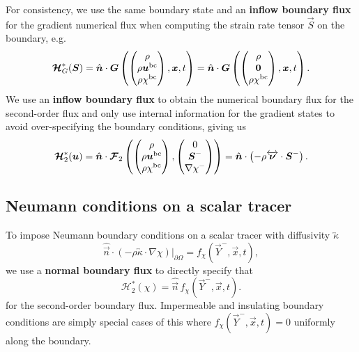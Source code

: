 \documentclass{report}
\numberwithin{equation}{section}
\begin{document}
For consistency, we use the same boundary state and an \textbf{inflow boundary flux} for the gradient numerical flux when computing the strain rate tensor $\vec S$  on the boundary, e.g. 
\begin{equation}
    \boldsymbol{{\mathcal{H}}}_G^*(\boldsymbol{{S}}) = \hat{\boldsymbol{{n}} } \cdot \boldsymbol{{G}} \left(\begin{pmatrix} \rho \\ \rho \boldsymbol{{u}}^{\text{bc}} \\ \rho \chi^{\text{bc}} \end{pmatrix}, \boldsymbol{{x}}, t \right) 
    = \hat{\boldsymbol{{n}} } \cdot \boldsymbol{{G}} \left(\begin{pmatrix} \rho \\ \boldsymbol{{0}} \\ \rho \chi^{\text{bc}} \end{pmatrix}, \boldsymbol{{x}}, t \right) .
\end{equation}
We use an \textbf{inflow boundary flux} to obtain the numerical boundary flux for the second-order flux and only use internal information for the gradient states to avoid over-specifying the boundary conditions, giving us
\begin{equation}
    \boldsymbol{{\mathcal{H}}}_2^*(\boldsymbol{{u}}) = \hat{\boldsymbol{{n}} } \cdot \boldsymbol{{\mathcal{F}}}_2\left(
        \begin{pmatrix} \rho \\ \rho \boldsymbol{{u}}^{\text{bc}} \\ \rho \chi^{\text{bc}} \end{pmatrix}, 
        \begin{pmatrix} 0 \\ \boldsymbol{{S}}^- \\ \nabla \chi^- \end{pmatrix}
    \right)
    = \hat{\boldsymbol{{n}} } \cdot \left( - \rho \overleftrightarrow{\boldsymbol{{\nu}}} \cdot \boldsymbol{{S}}^- \right).
\end{equation}

\subsection{Neumann conditions on a scalar tracer}

To impose Neumann boundary conditions on a scalar tracer with diffusivity $\overleftrightarrow{\kappa}$
\begin{equation}
    \hat{\vec n } \cdot \left( - \rho \overleftrightarrow{\kappa} \cdot  \nabla \chi \right)\bigg|_{\partial \Omega} = f_\chi \left( \vec Y^-, \vec x, t \right),
\end{equation}
we use a \textbf{normal boundary flux} to directly specify that
\begin{equation}
    \mathcal{H}_2^*(\chi) = \hat{\vec n } \, f_\chi(\vec Y^-, \vec x, t).
\end{equation}
for the second-order boundary flux. Impermeable and insulating boundary conditions are simply special cases of this where $f_\chi(\vec Y^-, \vec x, t) = 0$ uniformly along the boundary.
\end{document}
